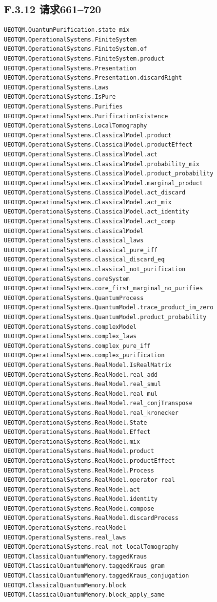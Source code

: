 \documentclass[
  11pt,
  oneside]{book}
\begin{document}
\subsection{F.3.12 请求661--720}

\begin{Verbatim}[breaklines,breakanywhere,fontsize=\scriptsize]
UEOTQM.QuantumPurification.state_mix
UEOTQM.OperationalSystems.FiniteSystem
UEOTQM.OperationalSystems.FiniteSystem.of
UEOTQM.OperationalSystems.FiniteSystem.product
UEOTQM.OperationalSystems.Presentation
UEOTQM.OperationalSystems.Presentation.discardRight
UEOTQM.OperationalSystems.Laws
UEOTQM.OperationalSystems.IsPure
UEOTQM.OperationalSystems.Purifies
UEOTQM.OperationalSystems.PurificationExistence
UEOTQM.OperationalSystems.LocalTomography
UEOTQM.OperationalSystems.ClassicalModel.product
UEOTQM.OperationalSystems.ClassicalModel.productEffect
UEOTQM.OperationalSystems.ClassicalModel.act
UEOTQM.OperationalSystems.ClassicalModel.probability_mix
UEOTQM.OperationalSystems.ClassicalModel.product_probability
UEOTQM.OperationalSystems.ClassicalModel.marginal_product
UEOTQM.OperationalSystems.ClassicalModel.act_discard
UEOTQM.OperationalSystems.ClassicalModel.act_mix
UEOTQM.OperationalSystems.ClassicalModel.act_identity
UEOTQM.OperationalSystems.ClassicalModel.act_comp
UEOTQM.OperationalSystems.classicalModel
UEOTQM.OperationalSystems.classical_laws
UEOTQM.OperationalSystems.classical_pure_iff
UEOTQM.OperationalSystems.classical_discard_eq
UEOTQM.OperationalSystems.classical_not_purification
UEOTQM.OperationalSystems.coreSystem
UEOTQM.OperationalSystems.core_first_marginal_no_purifies
UEOTQM.OperationalSystems.QuantumProcess
UEOTQM.OperationalSystems.QuantumModel.trace_product_im_zero
UEOTQM.OperationalSystems.QuantumModel.product_probability
UEOTQM.OperationalSystems.complexModel
UEOTQM.OperationalSystems.complex_laws
UEOTQM.OperationalSystems.complex_pure_iff
UEOTQM.OperationalSystems.complex_purification
UEOTQM.OperationalSystems.RealModel.IsRealMatrix
UEOTQM.OperationalSystems.RealModel.real_add
UEOTQM.OperationalSystems.RealModel.real_smul
UEOTQM.OperationalSystems.RealModel.real_mul
UEOTQM.OperationalSystems.RealModel.real_conjTranspose
UEOTQM.OperationalSystems.RealModel.real_kronecker
UEOTQM.OperationalSystems.RealModel.State
UEOTQM.OperationalSystems.RealModel.Effect
UEOTQM.OperationalSystems.RealModel.mix
UEOTQM.OperationalSystems.RealModel.product
UEOTQM.OperationalSystems.RealModel.productEffect
UEOTQM.OperationalSystems.RealModel.Process
UEOTQM.OperationalSystems.RealModel.operator_real
UEOTQM.OperationalSystems.RealModel.act
UEOTQM.OperationalSystems.RealModel.identity
UEOTQM.OperationalSystems.RealModel.compose
UEOTQM.OperationalSystems.RealModel.discardProcess
UEOTQM.OperationalSystems.realModel
UEOTQM.OperationalSystems.real_laws
UEOTQM.OperationalSystems.real_not_localTomography
UEOTQM.ClassicalQuantumMemory.taggedKraus
UEOTQM.ClassicalQuantumMemory.taggedKraus_gram
UEOTQM.ClassicalQuantumMemory.taggedKraus_conjugation
UEOTQM.ClassicalQuantumMemory.block
UEOTQM.ClassicalQuantumMemory.block_apply_same
\end{Verbatim}
\end{document}
